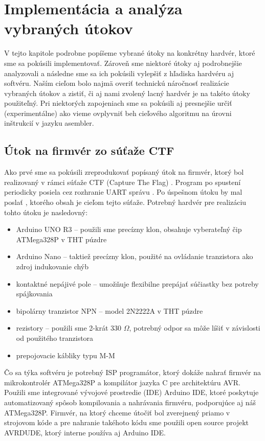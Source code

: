 \chapter{Implementácia a analýza vybraných útokov}

\label{kap:utoky} %

V tejto kapitole podrobne popíšeme vybrané útoky na konkrétny hardvér, ktoré sme sa pokúsili implementovať. Zároveň sme niektoré útoky aj podrobnejšie analyzovali a následne sme sa ich pokúsili vylepšiť z hľadiska hardvéru aj softvéru. Naším cieľom bolo najmä overiť technickú náročnosť realizácie vybraných útokov a zistiť, či aj nami zvolený lacný hardvér je na takéto útoky použiteľný. Pri niektorých zapojeniach sme sa pokúsili aj presnejšie určiť (experimentálne) ako vieme ovplyvniť beh cieľového algoritmu na úrovni inštrukcií v jazyku asembler.

\section{Útok na firmvér zo súťaže CTF}
Ako prvé sme sa pokúsili zreprodukovať popísaný útok na firmvér, ktorý bol realizovaný v rámci súťaže CTF (Capture The Flag) \cite{vccOnTheCheap}. Program po spustení periodicky posiela cez rozhranie UART správu . Po úspešnom útoku by mal poslať , ktorého obsah je cieľom tejto súťaže. Potrebný hardvér pre realizáciu tohto útoku je nasledovný:
\begin{itemize}
    \item Arduino UNO R3 -- použili sme precízny klon, obsahuje vyberateľný čip ATMega328P v THT púzdre
    \item Arduino Nano -- taktiež precízny klon, použité na ovládanie tranzistora ako zdroj indukovanie chýb
    \item kontaktné nepájivé pole -- umožňuje flexibilne prepájať súčiastky bez potreby spájkovania
    \item bipolárny tranzistor NPN -- model 2N2222A v THT púzdre
    \item rezistory -- použili sme 2-krát 330 $\Omega$, potrebný odpor sa môže líšiť v závislosti od použitého tranzistora
    \item prepojovacie kábliky typu M-M
\end{itemize}
Čo sa týka softvéru je potrebný ISP programátor, ktorý dokáže nahrať firmvér na mikrokontrolér ATMega328P a kompilátor jazyka C pre architektúru AVR. Použili sme integrované vývojové prostredie (IDE) Arduino IDE, ktoré poskytuje automatizovaný spôsob kompilovania a nahrávania firmvéru, podporujúce aj náš ATMega328P. Firmvér, na ktorý chceme útočiť bol zverejnený priamo v strojovom kóde a pre nahranie takéhoto kódu sme použili open source projekt AVRDUDE, ktorý interne používa aj Arduino IDE.

